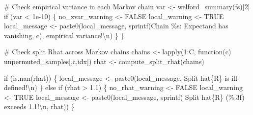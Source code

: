 \documentclass[
  letterpaper,
  DIV=11,
  numbers=noendperiod]{scrartcl}
\newenvironment{Shaded}{\begin{snugshade}}{\end{snugshade}}
\newcommand{\CommentTok}[1]{\textcolor[rgb]{0.37,0.37,0.37}{#1}}
\newcommand{\ConstantTok}[1]{\textcolor[rgb]{0.56,0.35,0.01}{#1}}
\newcommand{\ControlFlowTok}[1]{\textcolor[rgb]{0.00,0.23,0.31}{#1}}
\newcommand{\DecValTok}[1]{\textcolor[rgb]{0.68,0.00,0.00}{#1}}
\newcommand{\FloatTok}[1]{\textcolor[rgb]{0.68,0.00,0.00}{#1}}
\newcommand{\FunctionTok}[1]{\textcolor[rgb]{0.28,0.35,0.67}{#1}}
\newcommand{\NormalTok}[1]{\textcolor[rgb]{0.00,0.23,0.31}{#1}}
\newcommand{\OtherTok}[1]{\textcolor[rgb]{0.00,0.23,0.31}{#1}}
\newcommand{\SpecialCharTok}[1]{\textcolor[rgb]{0.37,0.37,0.37}{#1}}
\newcommand{\StringTok}[1]{\textcolor[rgb]{0.13,0.47,0.30}{#1}}
\begin{document}
\begin{Shaded}
\begin{Highlighting}[]
      \CommentTok{\# Check empirical variance in each Markov chain}
\NormalTok{      var }\OtherTok{\textless{}{-}} \FunctionTok{welford\_summary}\NormalTok{(fs)[}\DecValTok{2}\NormalTok{]}
      \ControlFlowTok{if}\NormalTok{ (var }\SpecialCharTok{\textless{}} \FloatTok{1e{-}10}\NormalTok{) \{}
\NormalTok{        no\_zvar\_warning }\OtherTok{\textless{}{-}} \ConstantTok{FALSE}
\NormalTok{        local\_warning }\OtherTok{\textless{}{-}} \ConstantTok{TRUE}
\NormalTok{        local\_message }\OtherTok{\textless{}{-}}
          \FunctionTok{paste0}\NormalTok{(local\_message,}
                 \FunctionTok{sprintf}\NormalTok{(}\StringTok{\textquotesingle{}Chain \%s: Expectand has vanishing\textquotesingle{}}\NormalTok{, c),}
                 \StringTok{\textquotesingle{} empirical variance!}\SpecialCharTok{\textbackslash{}n}\StringTok{\textquotesingle{}}\NormalTok{)}
\NormalTok{      \}}
\NormalTok{    \}}
  
    \CommentTok{\# Check split Rhat across Markov chains}
\NormalTok{    chains }\OtherTok{\textless{}{-}} \FunctionTok{lapply}\NormalTok{(}\DecValTok{1}\SpecialCharTok{:}\NormalTok{C, }\ControlFlowTok{function}\NormalTok{(c) unpermuted\_samples[,c,idx])}
\NormalTok{    rhat }\OtherTok{\textless{}{-}} \FunctionTok{compute\_split\_rhat}\NormalTok{(chains)}

    \ControlFlowTok{if}\NormalTok{ (}\FunctionTok{is.nan}\NormalTok{(rhat)) \{}
\NormalTok{      local\_message }\OtherTok{\textless{}{-}} \FunctionTok{paste0}\NormalTok{(local\_message,}
                              \StringTok{\textquotesingle{}  Split hat\{R\} is ill{-}defined!}\SpecialCharTok{\textbackslash{}n}\StringTok{\textquotesingle{}}\NormalTok{)}
\NormalTok{    \} }\ControlFlowTok{else} \ControlFlowTok{if}\NormalTok{ (rhat }\SpecialCharTok{\textgreater{}} \FloatTok{1.1}\NormalTok{) \{}
\NormalTok{      no\_rhat\_warning }\OtherTok{\textless{}{-}} \ConstantTok{FALSE}
\NormalTok{      local\_warning }\OtherTok{\textless{}{-}} \ConstantTok{TRUE}
\NormalTok{      local\_message }\OtherTok{\textless{}{-}}
        \FunctionTok{paste0}\NormalTok{(local\_message,}
               \FunctionTok{sprintf}\NormalTok{(}\StringTok{\textquotesingle{}  Split hat\{R\} (\%.3f) exceeds 1.1!}\SpecialCharTok{\textbackslash{}n}\StringTok{\textquotesingle{}}\NormalTok{, rhat))}
\NormalTok{    \}}


\end{Highlighting}
\end{Shaded}
\end{document}

